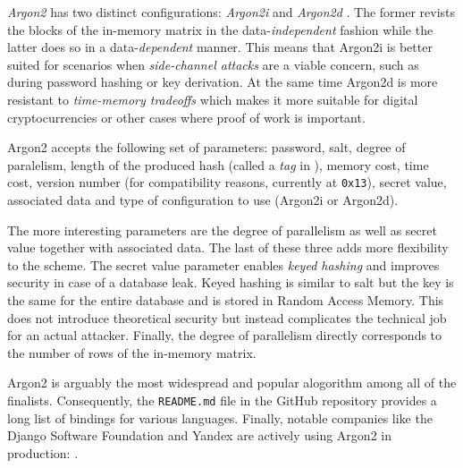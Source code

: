 \emph{Argon2} has two distinct configurations: \emph{Argon2i} and \emph{Argon2d} \cite{biryukov:2015:argon2}. The former revists the blocks of the in-memory matrix in the data-\emph{independent} fashion while the latter does so in a data-\emph{dependent} manner. This means that Argon2i is better suited for scenarios when \emph{side-channel attacks} are a viable concern, such as during password hashing or key derivation. At the same time Argon2d is more resistant to \emph{time-memory tradeoffs} which makes it more suitable for digital cryptocurrencies or other cases where proof of work is important.

Argon2 accepts the following set of parameters: password, salt, degree of paralelism, length of the produced hash (called a \emph{tag} in \cite{biryukov:2015:argon2}), memory cost, time cost, version number (for compatibility reasons, currently at \texttt{0x13}), secret value, associated data and type of configuration to use (Argon2i or Argon2d).

The more interesting parameters are the degree of parallelism as well as secret value together with associated data. The last of these three adds more flexibility to the scheme. The secret value parameter enables \emph{keyed hashing} and improves security in case of a database leak. Keyed hashing is similar to salt but the key is the same for the entire database and is stored in Random Access Memory. This does not introduce theoretical security but instead complicates the technical job for an actual attacker. Finally, the degree of parallelism directly corresponds to the number of rows of the in-memory matrix.

Argon2 is arguably the most widespread and popular alogorithm among all of the finalists. Consequently, the \texttt{README.md} file in the GitHub repository \cite{github:2017:argon2} provides a long list of bindings for various languages. Finally, notable companies like the Django Software Foundation and Yandex are actively using Argon2 in production: \cite{django:2017:argon2, github:2017:argonische}.
